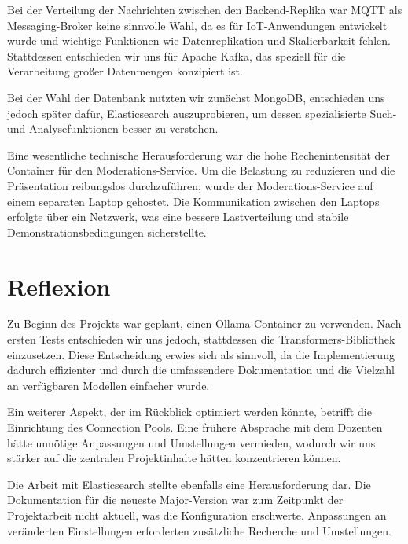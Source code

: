 \documentclass[12pt]{report}
\begin{document}
Bei der Verteilung der Nachrichten zwischen den Backend-Replika war MQTT als Messaging-Broker keine sinnvolle Wahl, da es für IoT-Anwendungen entwickelt wurde und wichtige Funktionen wie Datenreplikation und Skalierbarkeit fehlen. Stattdessen entschieden wir uns für Apache Kafka, das speziell für die Verarbeitung großer Datenmengen konzipiert ist.\newline

Bei der Wahl der Datenbank nutzten wir zunächst MongoDB, entschieden uns jedoch später dafür, Elasticsearch auszuprobieren, um dessen spezialisierte Such- und Analysefunktionen besser zu verstehen.\newline

Eine wesentliche technische Herausforderung war die hohe Rechenintensität der Container für den Moderations-Service. Um die Belastung zu reduzieren und die Präsentation reibungslos durchzuführen, wurde der Moderations-Service auf einem separaten Laptop gehostet. Die Kommunikation zwischen den Laptops erfolgte über ein Netzwerk, was eine bessere Lastverteilung und stabile Demonstrationsbedingungen sicherstellte.

\chapter{Reflexion}

Zu Beginn des Projekts war geplant, einen Ollama-Container zu verwenden. Nach ersten Tests entschieden wir uns jedoch, stattdessen die Transformers-Bibliothek einzusetzen. Diese Entscheidung erwies sich als sinnvoll, da die Implementierung dadurch effizienter und durch die umfassendere Dokumentation und die Vielzahl an verfügbaren Modellen einfacher wurde.\newline

Ein weiterer Aspekt, der im Rückblick optimiert werden könnte, betrifft die Einrichtung des Connection Pools. Eine frühere Absprache mit dem Dozenten hätte unnötige Anpassungen und Umstellungen vermieden, wodurch wir uns stärker auf die zentralen Projektinhalte hätten konzentrieren können.\newline

Die Arbeit mit Elasticsearch stellte ebenfalls eine Herausforderung dar. Die Dokumentation für die neueste Major-Version war zum Zeitpunkt der Projektarbeit nicht aktuell, was die Konfiguration erschwerte. Anpassungen an veränderten Einstellungen erforderten zusätzliche Recherche und Umstellungen.\newline
\end{document}
